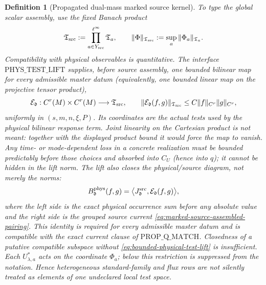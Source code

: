 \documentclass[11pt]{article}
\newtheorem{definition}[theorem]{Definition}
\begin{document}
\begin{definition}[Propagated dual-mass marked source kernel]
To type the global scalar assembly, use the fixed Banach product
\begin{equation}
\label{eq:global-source-test-space}
 \mathfrak T_{\rm src}:=
 \prod_{a\in Y_{\rm src}}^{\ell^\infty}\mathfrak T_a,
 \qquad
 \|\Phi\|_{\mathfrak T_{\rm src}}
 :=\sup_a\|\Phi_a\|_{\mathfrak T_a}.
\end{equation}
Compatibility with physical observables is quantitative.  The interface
$\mathrm{PHYS\_TEST\_LIFT}$ supplies, before source assembly, one bounded
bilinear map for every admissible master datum (equivalently, one bounded
linear map on the projective tensor product),
\begin{equation}
\label{eq:bounded-physical-test-lift}
 \mathcal E_{\mathfrak d}:C^r(M)\times C^r(M)
       \longrightarrow\mathfrak T_{\rm src},\qquad
 \|\mathcal E_{\mathfrak d}(f,g)\|_{\mathfrak T_{\rm src}}
 \le C\|f\|_{C^r}\|g\|_{C^r},
\end{equation}
uniformly in $(s,m,n,\xi,P)$.  Its coordinates are the actual tests used by
the physical bilinear response term.  Joint linearity on the Cartesian
product is not meant: together with the displayed product bound it would
force the map to vanish.  Any time- or mode-dependent loss in a concrete
realization must be bounded predictably before those choices and absorbed
into $C_U$ (hence into $q$); it cannot be hidden in the lift norm.
The lift also closes the physical/source diagram, not merely the norms:
\begin{equation}
\label{eq:physical-test-lift-commutation}
 B_{\mathfrak d}^{\rm phys}(f,g)
 =\big\langle J_{\mathfrak d}^{\rm src},
       \mathcal E_{\mathfrak d}(f,g)\big\rangle,
\end{equation}
where the left side is the exact physical occurrence sum before any
absolute value and the right side is the grouped source current
\eqref{eq:marked-source-assembled-pairing}.  This identity is required for
every admissible master datum and is compatible with the exact current
clause of $\mathrm{PROP\_Q\_MATCH}$.
Closedness of a putative compatible subspace without
\eqref{eq:bounded-physical-test-lift} is insufficient.  Each
$U_{\lambda,a}^*$ acts on the coordinate
$\Phi_a$; below this restriction is suppressed from the notation.  Hence
heterogeneous standard-family and flux rows are not silently treated as
elements of one undeclared local test space.


\end{definition}
\end{document}
